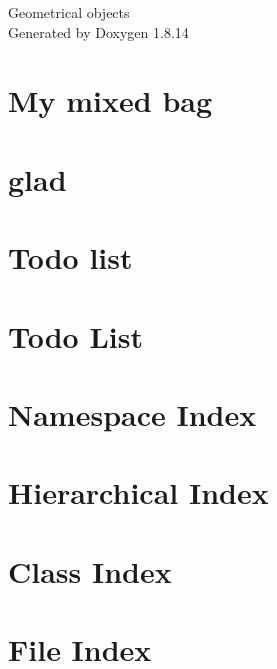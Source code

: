 \documentclass[twoside]{book}
\newcommand{\+}{\discretionary{\mbox{\scriptsize$\hookleftarrow$}}{}{}}
\newcommand{\clearemptydoublepage}{%
  \newpage{\pagestyle{empty}\cleardoublepage}%
}
\begin{document}
\hypersetup{pageanchor=false,
             bookmarksnumbered=true,
             pdfencoding=unicode
            }
\begin{titlepage}
\vspace*{7cm}
\begin{center}%
{\Large Geometrical objects }\\
\vspace*{1cm}
{\large Generated by Doxygen 1.8.14}\\
\end{center}
\end{titlepage}
\clearemptydoublepage
{}
\tableofcontents
\clearemptydoublepage
{}
\hypersetup{pageanchor=true}

\chapter{My mixed bag}
\label{md_README}

\chapter{glad}
\label{md_third_party_glad_README}

\chapter{Todo list}
\label{md_TODO}

\chapter{Todo List}
\label{todo}

\chapter{Namespace Index}

\chapter{Hierarchical Index}

\chapter{Class Index}

\chapter{File Index}

\end{document}
